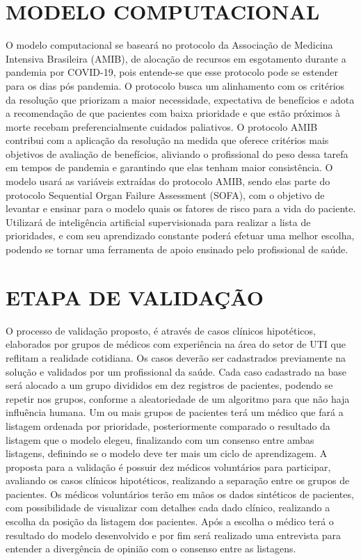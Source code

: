 \documentclass[12pt]{article}
\begin{document}
\section{MODELO COMPUTACIONAL}

O modelo computacional se baseará no protocolo da Associação de Medicina Intensiva Brasileira (AMIB), de alocação de recursos em esgotamento durante a pandemia por COVID-19, pois entende-se que esse protocolo pode se estender para os dias pós pandemia. O protocolo busca um alinhamento com os critérios da resolução que priorizam a maior necessidade, expectativa de benefícios e adota a recomendação de que pacientes com baixa prioridade e que estão próximos à morte recebam preferencialmente cuidados paliativos. O protocolo AMIB contribui com a aplicação da resolução na medida que oferece critérios mais objetivos de avaliação de benefícios, aliviando o profissional do peso dessa tarefa em tempos de pandemia e garantindo que elas tenham maior consistência.
O modelo usará as variáveis extraídas do protocolo AMIB, sendo elas parte do protocolo Sequential Organ Failure Assessment (SOFA), com o objetivo de levantar e ensinar para o modelo quais os fatores de risco para a vida do paciente.
Utilizará de inteligência artificial supervisionada para realizar a lista de prioridades, e com seu aprendizado constante poderá efetuar uma melhor escolha, podendo se tornar uma ferramenta de apoio ensinado pelo profissional de saúde.

\section{ETAPA DE VALIDAÇÃO}
O processo de validação proposto, é através de casos clínicos hipotéticos, elaborados por grupos de médicos com experiência na área do setor de UTI que reflitam a realidade cotidiana. Os casos deverão ser cadastrados previamente na solução e validados por um profissional da saúde. Cada caso cadastrado na base será alocado a um grupo divididos em dez registros de pacientes, podendo se repetir nos grupos, conforme a aleatoriedade de um algoritmo para que não haja influência humana.
Um ou mais grupos de pacientes  terá  um  médico  que  fará  a  listagem  ordenada por prioridade, posteriormente comparado o resultado da listagem que o modelo elegeu, finalizando com um consenso entre ambas listagens, definindo se o modelo deve ter mais um ciclo de aprendizagem.
A proposta para a validação é possuir dez médicos voluntários para participar, avaliando os casos clínicos hipotéticos, realizando a separação entre os grupos de pacientes.
Os médicos voluntários terão em mãos os dados sintéticos de pacientes, com possibilidade de visualizar com detalhes cada dado clínico, realizando a escolha da posição da listagem dos pacientes. Após a escolha o médico terá o resultado do modelo desenvolvido e por fim será realizado uma entrevista para entender a divergência de opinião com o consenso entre as listagens.
\end{document}
